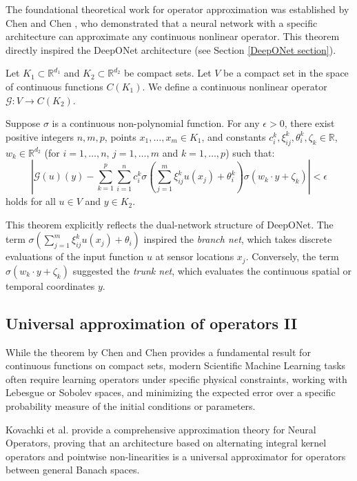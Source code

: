 The foundational theoretical work for operator approximation was established by Chen and Chen \cite{Chen_Chen_1995}, who demonstrated that a neural network with a specific architecture can approximate any continuous nonlinear operator. This theorem directly inspired the DeepONet architecture \cite{lu2021learning} (see Section \ref{DeepONet section}).

Let $K_1 \subset \mathbb{R}^{d_1}$ and $K_2 \subset \mathbb{R}^{d_2}$ be compact sets. Let $V$ be a compact set in the space of continuous functions $C(K_1)$. We define a continuous nonlinear operator $\mathcal{G} : V \to C(K_2)$. 

\begin{theorem}
Suppose $\sigma$ is a continuous non-polynomial function. For any $\epsilon > 0$, there exist positive integers $n, m, p$, points $x_1, \dots, x_m \in K_1$, and constants $c_i^k, \xi_{ij}^k, \theta_i^k, \zeta_k \in \mathbb{R}$, $w_k \in \mathbb{R}^{d_2}$ (for $i=1,\dots,n$, $j=1,\dots,m$ and $k=1,\dots,p$) such that:
$$ \left| \mathcal{G}(u)(y) - \sum_{k=1}^p \sum_{i=1}^n c_i^k \sigma \left( \sum_{j=1}^m \xi_{ij}^k u(x_j) + \theta_i^k \right) \sigma(w_k \cdot y + \zeta_k) \right| < \epsilon $$
holds for all $u \in V$ and $y \in K_2$.
\end{theorem}

This theorem explicitly reflects the dual-network structure of DeepONet. The term $\sigma\left(\sum_{j=1}^m \xi_{ij}^k u(x_j) + \theta_i\right)$ inspired the \textit{branch net}, which takes discrete evaluations of the input function $u$ at sensor locations $x_j$. Conversely, the term $\sigma(w_k \cdot y + \zeta_k)$ suggested the \textit{trunk net}, which evaluates the continuous spatial or temporal coordinates $y$.


\subsection{Universal approximation of operators II}

While the theorem by Chen and Chen \cite{Chen_Chen_1995} provides a fundamental result for continuous functions on compact sets, modern Scientific Machine Learning tasks often require learning operators under specific physical constraints, working with Lebesgue or Sobolev spaces, and minimizing the expected error over a specific probability measure of the initial conditions or parameters.

Kovachki et al. \cite{kovachki2023neural} provide a comprehensive approximation theory for Neural Operators, proving that an architecture based on alternating integral kernel operators and pointwise non-linearities is a universal approximator for operators between general Banach spaces. 

